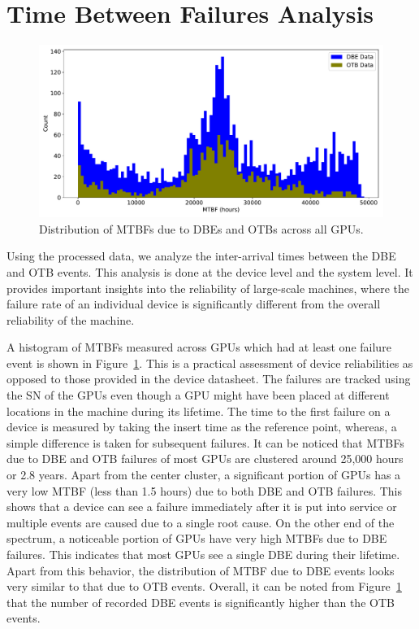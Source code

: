 \section{Time Between Failures Analysis}
\label{section:tbf}

\begin{figure}[bt]
  \begin{center}
    \includegraphics[width=\columnwidth]{figs/MTBF_GPUwise.pdf}
  \end{center}
  \caption{Distribution of MTBFs due to DBEs and OTBs across all GPUs.}
  \label{fig:Device_MTBFs}
\end{figure}

Using the processed data, we analyze the inter-arrival times between the DBE and OTB events. 
This analysis is done at the device level and the system level. 
It provides important insights into the reliability of large-scale machines, where the 
failure rate of an individual device is significantly different from the overall reliability
of the machine.  

A histogram of MTBFs measured across GPUs which had at least one failure event is shown 
in Figure~\ref{fig:Device_MTBFs}. This is a practical assessment of device reliabilities 
as opposed to those provided in the device datasheet. The failures are tracked using the
SN of the GPUs even though a GPU might have been placed at different locations in the 
machine during its lifetime. The time to the first failure on a device is measured by taking
the insert time as the reference point, whereas, a simple difference is taken for subsequent
failures. It can be noticed that MTBFs due to DBE and OTB failures of most GPUs are clustered around 
25,000 hours or 2.8 years. Apart from the center cluster, a significant portion of GPUs has a very 
low MTBF (less than 1.5 hours) due to both DBE and OTB failures. This shows that a device 
can see a failure immediately after it is put into service or multiple events are caused due 
to a single root cause. On the other end of the spectrum, a noticeable portion of GPUs have very high
MTBFs due to DBE failures. This indicates that most GPUs see a single DBE during their lifetime.
Apart from this behavior, the distribution of MTBF due to DBE events looks very similar to that due 
to OTB events. Overall, it can be noted from Figure~\ref{fig:Device_MTBFs} that the number of recorded 
DBE events is significantly higher than the OTB events. 

